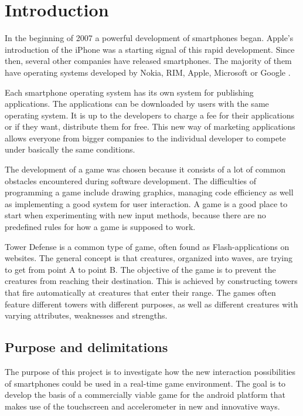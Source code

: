 \chapter{Introduction}

In the beginning of 2007 a powerful development of smartphones began. Apple's introduction of the iPhone was a starting signal of this rapid development. \citep{Time} Since then, several other companies have released smartphones. The majority of them have operating systems developed by Nokia, RIM, Apple, Microsoft or Google  \citep{Canalys}.

Each smartphone operating system has its own system for publishing applications. The applications can be downloaded by users with the same operating system. It is up to the developers to charge a fee for their applications or if they want, distribute them for free. This new way of marketing applications allows everyone from bigger companies to the individual developer to compete under basically the same conditions.

The development of a game was chosen because it consists of a lot of common obstacles encountered during software development. The difficulties of programming a game include drawing graphics, managing code efficiency as well as implementing a good system for user interaction. A game is a good place to start when experimenting with new input methods, because there are no predefined rules for how a game is supposed to work.

Tower Defense is a common type of game, often found as Flash-applications on websites. The general concept is that creatures, organized into waves, are trying to get from point A to point B. The objective of the game is to prevent the creatures from reaching their destination. This is achieved by constructing towers that fire automatically at creatures that enter their range. The games often feature different towers with different purposes, as well as different creatures with varying attributes, weaknesses and strengths. 

\section{Purpose and delimitations}

The purpose of this project is to investigate how the new interaction possibilities of smartphones could be used in a real-time game environment. The goal is to develop the basis of a commercially viable game for the android platform that makes use of the touchscreen and accelerometer in new and innovative ways.

